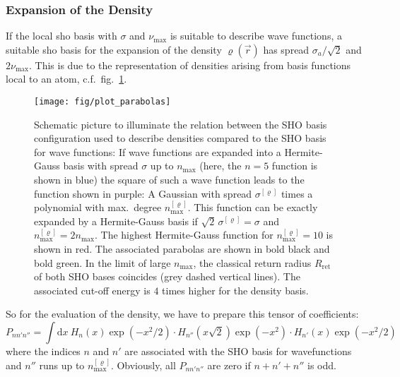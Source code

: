 \documentclass[oribibl]{llncs}
\newcommand{\um}[1]{_{\mathrm{#1}}}
\begin{document}
\subsubsection{Expansion of the Density}
If the local \ac{sho} basis with $\sigma$ and $\nu\um{max}$
is suitable to describe wave functions, 
a suitable \ac{sho} basis for the expansion of the density $\varrho(\vec r)$ has
spread $\sigma_a/\sqrt{2}$ and $2\nu\um{max}$.
This is due to the representation of densities
arising from basis functions local to an atom, c.f.~fig.~\ref{fig:plot_parabolas}.
%
\begin{figure}
  \begin{minipage}[c]{.990\textwidth}
	\texttt{[image: fig/plot\_parabolas]} %
  \end{minipage}\hfill
  \begin{minipage}[c]{.009\textwidth}
  \end{minipage}
  \label{fig:plot_parabolas}
  \caption{
Schematic picture to illuminate the relation between the SHO basis configuration 
used to describe densities
compared to the SHO basis for wave functions:
If wave functions are expanded into a Hermite-Gauss basis with spread $\sigma$
up to $n\um{max}$ (here, the $n = 5$ function is shown in blue)
the square of such a wave function leads to the function shown in purple:
A Gaussian with spread $\sigma^{[\varrho]}$ times a polynomial with max.~degree $n\um{max}^{[\varrho]}$.
This function can be exactly expanded by a Hermite-Gauss basis if
$\sqrt{2}\,\sigma^{[\varrho]} = \sigma$
and
$n\um{max}^{[\varrho]} = 2n\um{max}$.
The highest Hermite-Gauss function for $n\um{max}^{[\varrho]} = 10$ is shown in red.
The associated parabolas are shown in bold black and bold green.
In the limit of large $n\um{max}$, the classical return radius $R\um{ret}$
of both SHO bases coincides (grey dashed vertical lines).
The associated cut-off energy is $4$ times higher for the density basis.
  }
\end{figure}
%
%

So for the evaluation of the density,
we have to prepare this tensor of coefficients:
\begin{equation}
	P_{nn'n''} = \int \mathrm d x \ H_{n}(x) \exp(-x^2/2) \cdot H_{n''}(x\sqrt{2}) \exp(-x^2) \cdot H_{n'}(x) \exp(-x^2/2)
\end{equation}
where the indices $n$ and $n'$ are associated with the SHO basis for wavefunctions
and $n''$ runs up to $n\um{max}^{[\varrho]}$. 
Obviously, all $P_{nn'n''}$ are zero if $n + n' + n''$ is odd.
\end{document}
